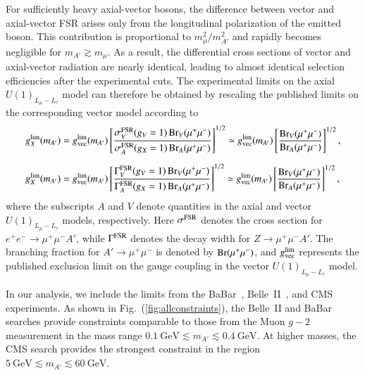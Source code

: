 \documentclass[onecolumn, aps, nofootinbib, prd, preprint, floats, floatfix, amsmath, amssymb, superscriptaddress, preprintnumbers]{revtex4-1}
\begin{document}
For sufficiently heavy axial-vector bosons, the difference between vector and axial-vector FSR arises only from the longitudinal polarization of the emitted boson. This contribution is proportional to $m_\mu^2/m_{A'}^2$ and rapidly becomes negligible for $m_{A'}\gtrsim m_\mu$. As a result, the differential cross sections of vector and axial-vector radiation are nearly identical, leading to almost identical selection efficiencies after the experimental cuts. The experimental limits on the axial $U(1)_{L_\mu-L_\tau}$ model can therefore be obtained by rescaling the published limits on the corresponding vector model according to
\begin{equation}
	\begin{aligned}
		g_X^{\rm lim}(m_{A'})
		&=
		g_{\rm vec}^{\rm lim}(m_{A'})
		\left[
		\frac{\sigma_V^{\rm FSR}(g_V=1)\,
			{\rm Br}_V(\mu^+\mu^-)}
		{\sigma_A^{\rm FSR}(g_X=1)\,
			{\rm Br}_A(\mu^+\mu^-)}
		\right]^{1/2}
		\simeq
		g_{\rm vec}^{\rm lim}(m_{A'})
		\left[
		\frac{{\rm Br}_V(\mu^+\mu^-)}
		{{\rm Br}_A(\mu^+\mu^-)}
		\right]^{1/2},
		\\[2mm]
		g_X^{\rm lim}(m_{A'})
		&=
		g_{\rm vec}^{\rm lim}(m_{A'})
		\left[
		\frac{\Gamma_V^{\rm FSR}(g_V=1)\,
			{\rm Br}_V(\mu^+\mu^-)}
		{\Gamma_A^{\rm FSR}(g_X=1)\,
			{\rm Br}_A(\mu^+\mu^-)}
		\right]^{1/2}
		\simeq
		g_{\rm vec}^{\rm lim}(m_{A'})
		\left[
		\frac{{\rm Br}_V(\mu^+\mu^-)}
		{{\rm Br}_A(\mu^+\mu^-)}
		\right]^{1/2},
	\end{aligned}
	\label{eq:four-muon-rescale}
\end{equation}
where the subscripts $A$ and $V$ denote quantities in the axial and vector $U(1)_{L_\mu-L_\tau}$ models, respectively. Here $\sigma^{\rm FSR}$ denotes the cross section for $e^+e^-\rightarrow\mu^+\mu^-A'$, while $\Gamma^{\rm FSR}$ denotes the decay width for $Z\rightarrow\mu^+\mu^-A'$. The branching fraction for $A'\rightarrow\mu^+\mu^-$ is denoted by ${\rm Br}(\mu^+\mu^-)$, and $g_{\rm vec}^{\rm lim}$ represents the published exclusion limit on the gauge coupling in the vector $U(1)_{L_\mu-L_\tau}$ model.

In our analysis, we include the limits from the BaBar~\cite{BaBar:2016sci}, Belle~II~\cite{Belle-II:2024wtd}, and CMS~\cite{CMS:2018yxg} experiments. As shown in Fig.~(\ref{fig:allconstraints}), the Belle~II and BaBar searches provide constraints comparable to those from the Muon $g-2$ measurement in the mass range $0.1~\mathrm{GeV}\lesssim m_{A'}\lesssim0.4~\mathrm{GeV}$. At higher masses, the CMS search provides the strongest constraint in the region$5~\mathrm{GeV}\lesssim m_{A'}\lesssim60~\mathrm{GeV}$.
\end{document}
